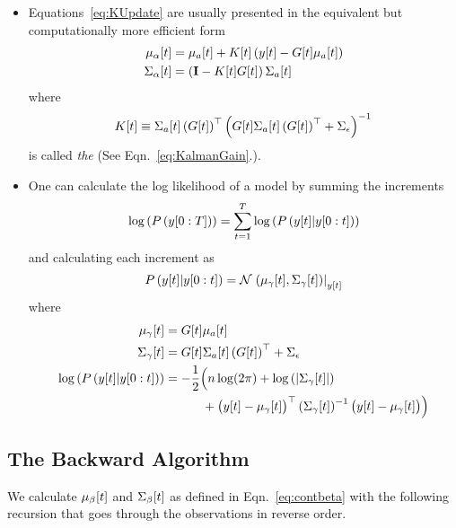 \begin{itemize}
\item Equations~\eqref{eq:KUpdate} are usually presented in the
  equivalent but computationally more efficient form
  \begin{align*}
    {\mu_\alpha}{[t]} &= {\mu_a}{[t]} + {K}{[t]} \left( {y}{[t]} -
    {G}{[t]} {\mu_a}{[t]} \right) \\
    {\Sigma_\alpha}{[t]} &= \left( {\bf I} - {K}{[t]} {G}{[t]} \right) {\Sigma_a}{[t]} 
  \end{align*}
  where
  \begin{equation*}
    {K}{[t]} \equiv {\Sigma_a}{[t]} \left( {G}{[t]} \right)^\top \left( {G}{[t]} {\Sigma_a}{[t]} \left( {G}{[t]} \right)^\top + \Sigma_\epsilon \right)^{-1}
  \end{equation*}
  is called \emph{the } %
  (See Eqn.~\eqref{eq:KalmanGain}.).
\item One can calculate the log likelihood of a model by summing the
  increments
  \begin{equation*}
    \log\left( P\left(y[0:T] \right)\right) = \sum_{t=1}^T
    \log\left(P \left({y}{[t]}|y[0:t] \right) \right)
  \end{equation*}
  and calculating each increment as
  \begin{equation*}
    P \left({y}{[t]}|y[0:t] \right) =
    {\mathcal{N}}\left.\left({\mu_\gamma}{[t]},{\Sigma_\gamma}{[t]}\right)\right|_{{y}{[t]}}
  \end{equation*}
  where
  \begin{align*}
    {\mu_\gamma}{[t]} &= {G}{[t]} {\mu_a}{[t]}\\
    {\Sigma_\gamma}{[t]} &= {G}{[t]} {\Sigma_a}{[t]} \left(
    {G}{[t]} \right)^\top + \Sigma_\epsilon\\
    \log\left( P \left({y}{[t]}|y[0:t] \right) \right) &= -
    \frac{1}{2} \Big( n \log(2\pi) + \log \left( \left|
    {\Sigma_\gamma}{[t]} \right| \right) \\ & \quad \quad \quad
    + \big( {y}{[t]} - {\mu_\gamma}{[t]} \big)^\top
    \left( {\Sigma_\gamma}{[t]} \right)^{-1}
    \big( {y}{[t]} - {\mu_\gamma}{[t]} \big)
    \Big)
  \end{align*}
\end{itemize}

\subsection{The Backward Algorithm}

We calculate ${\mu_\beta}{[t]}$ and ${\Sigma_\beta}{[t]}$ as defined
in Eqn.~\eqref{eq:contbeta} with the following recursion that goes
through the observations in reverse order.

